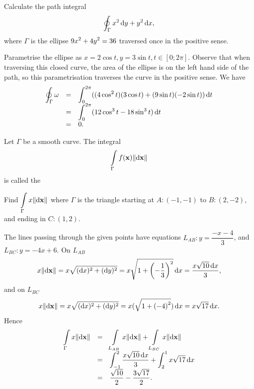 \begin{exa}
 Calculate the path integral $$\doint _{\Gamma}  x^2\d{y} + y^2\d{x},$$where $\Gamma$ is the ellipse
 $\displaystyle{9x^2 + 4y^2 = 36}$
traversed once in the positive sense. \end{exa} \begin{solu}
Parametrise the ellipse as $x = 2\cos t, y = 3\sin t, t\in [0;
2\pi]$. Observe that when traversing this closed curve, the area of
the ellipse is on the left hand side of the path, so this
parametrisation traverses the curve in the positive sense. We have
$$\begin{array}{lll}
\doint _{\Gamma} \omega & = & \dint _0 ^{2\pi} ((4\cos^2t)(3\cos t)
+
(9\sin t)(-2\sin t) )\d t \\
& = & \dint _0 ^{2\pi} (12\cos^3t - 18\sin^3t) \d t \\
& = & 0.
\end{array}$$





\end{solu}



\begin{df}
 Let $\Gamma$ be a smooth curve. The integral $$\dint \limits_\Gamma f(\point{x}) \norm{\d{\point{x}}}
 $$is called the 
\end{df}
\begin{exa}\label{exa:int_along_a_length}
Find $\dint \limits_\Gamma x \norm{\d{\point{x}}} $ where $\Gamma$
is the triangle starting at  $A:(-1,-1)$ to $B:(2,-2)$, and ending
in $C:(1,2)$.
\end{exa}\begin{solu} The lines passing through the given  points have
equations $L_{AB}: y = \dfrac{-x - 4}{3}$,  and $L_{BC}: y = -4x +
6$. On $L_{AB}$ $$ x\norm{\d{\point{x}}} = x\sqrt{(\d{x})^2 +
(\d{y})^2} = x\sqrt{1 + \left(-\dfrac{1}{3}\right)^2}\d{x} =
\dfrac{x\sqrt{10}\d{x}}{3},
$$and on $L_{BC}$
$$ x\norm{\d{\point{x}}} = x\sqrt{(\d{x})^2 +
(\d{y})^2} = x(\sqrt{1 + \left(-4\right)^2})\d{x} =
x\sqrt{17}\d{x}.
$$Hence
$$\begin{array}{lll}\dint \limits_\Gamma x \norm{\d{\point{x}}} & = & \dint \limits_{L_{AB}} x \norm{\d{\point{x}}}  + \dint \limits_{L_{BC}} x \norm{\d{\point{x}}}  \\
& = & \dint _{-1} ^2  \dfrac{x\sqrt{10}\d{x}}{3} + \dint _2 ^1
x\sqrt{17}\d{x} \\
& = &  \dfrac{\sqrt{10}}{2}  - \dfrac{3\sqrt{17}}{2}.
\end{array}
$$






\end{solu}

